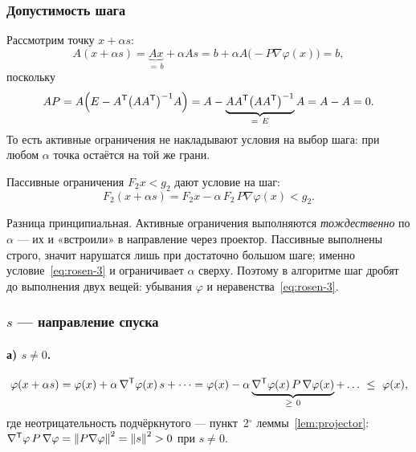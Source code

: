 \subsubsection*{Допустимость шага}

Рассмотрим точку $x + \alpha s$:
\[
  A(x + \alpha s) = \underbrace{Ax}_{=\,b} + \alpha A s
  = b + \alpha A\big(-P \nabla\varphi(x)\big) = b ,
  \tag{2}\label{eq:rosen-2}
\]
поскольку
\[
  A P = A\Big(E - A^{\mathsf{T}} \big(A A^{\mathsf{T}}\big)^{-1} A\Big)
      = A - \underbrace{A A^{\mathsf{T}} \big(A A^{\mathsf{T}}\big)^{-1}}_{=\ E} A
      = A - A = 0 .
\]
То есть активные ограничения не накладывают условия на выбор шага: при любом
$\alpha$ точка остаётся на той же грани.

Пассивные ограничения $F_2 x < g_2$ дают условие на шаг:
\[
  F_2(x + \alpha s) = F_2 x - \alpha\, F_2\, P \nabla\varphi(x) < g_2 .
  \tag{3}\label{eq:rosen-3}
\]

\begin{idea}
Разница принципиальная. Активные ограничения выполняются \emph{тождественно} по
$\alpha$ — их и «встроили» в направление через проектор. Пассивные выполнены
строго, значит нарушатся лишь при достаточно большом шаге; именно
условие~\eqref{eq:rosen-3} и ограничивает $\alpha$ сверху. Поэтому в алгоритме
шаг дробят до выполнения двух вещей: убывания $\varphi$ и
неравенства~\eqref{eq:rosen-3}.
\end{idea}

\subsubsection*{$s$ — направление спуска}

\paragraph{а) $s \ne 0$.}
\[
  \varphi(x + \alpha s)
  = \varphi(x) + \alpha\,\nabla^{\mathsf{T}}\varphi(x)\, s + \dots
  = \varphi(x) - \alpha \underbrace{\nabla^{\mathsf{T}}\varphi(x)\, P\, \nabla\varphi(x)}_{\ge\ 0}
    + \dots \ \le\ \varphi(x) ,
\]
где неотрицательность подчёркнутого — пункт~2$^\circ$
леммы~\ref{lem:projector}: $\nabla^{\mathsf{T}}\varphi\, P\, \nabla\varphi
= \left\lVert P \nabla\varphi \right\rVert^2 = \left\lVert s \right\rVert^2 > 0$ при $s \ne 0$.

